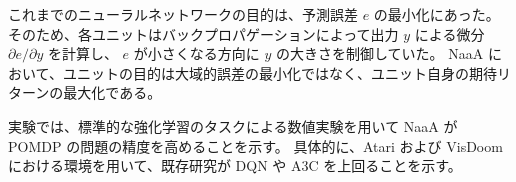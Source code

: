 これまでのニューラルネットワークの目的は、予測誤差 $e$ の最小化にあった。
そのため、各ユニットはバックプロパゲーションによって出力 $y$ による微分 $\partial e / \partial y$ を計算し、
$e$ が小さくなる方向に $y$ の大きさを制御していた。
NaaA において、ユニットの目的は大域的誤差の最小化ではなく、ユニット自身の期待リターンの最大化である。

実験では、標準的な強化学習のタスクによる数値実験を用いて NaaA が POMDP の問題の精度を高めることを示す。
具体的に、Atari および VisDoom における環境を用いて、既存研究が DQN や A3C を上回ることを示す。

